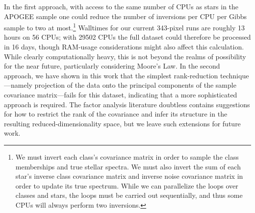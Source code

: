 \documentclass[a4paper,fleqn,usenatbib]{mnras}
\newcommand{\mkn}[1]{\textbf{\textcolor{red}{MKN: #1}}}
\begin{document}
In the first approach, with access to the same number of CPUs as stars in the APOGEE sample one could reduce the number of inversions per CPU per Gibbs sample to two at most.\footnote{We must invert each class's covariance matrix in order to sample the class memberships and true stellar spectra. We must also invert the sum of each star's inverse class covariance matrix and inverse noise covariance matrix in order to update its true spectrum. While we can parallelize the loops over classes and stars, the loops must be carried out sequentially, and thus some CPUs will always perform two inversions.} Walltimes for our current 343-pixel runs are roughly 13 hours on 56 CPUs; with 29502 CPUs the full dataset could therefore be processed in 16 days, though RAM-usage considerations might also affect this calculation. While clearly computationally heavy, this is not beyond the realms of possibility for the near future, particularly considering Moore's Law. In the second approach, we have shown in this work that the simplest rank-reduction technique---namely projection of the data onto the principal components of the sample covariance matrix---fails for this dataset, indicating that a more sophisticated approach is required. The factor analysis literature doubtless contains suggestions for how to restrict the rank of the covariance and infer its structure in the resulting reduced-dimensionality space, but we leave such extensions for future work.

\end{document}

